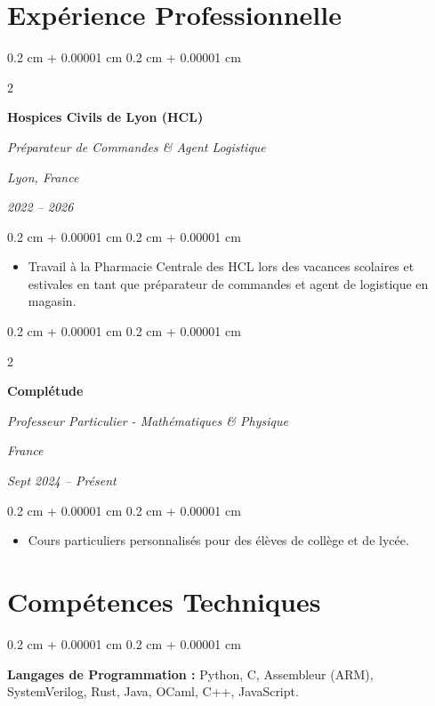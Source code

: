 \documentclass[10pt, a4]{article}
\newenvironment{highlights}{
    \begin{itemize}[
        topsep=0.10 cm,
        parsep=0.10 cm,
        partopsep=0pt,
        itemsep=0pt,
        leftmargin=0.4 cm + 10pt
    ]
}{
    \end{itemize}
} %
\newenvironment{onecolentry}{
    \begin{adjustwidth}{
        0.2 cm + 0.00001 cm
    }{
        0.2 cm + 0.00001 cm
    }
}{
    \end{adjustwidth}
} %
\newenvironment{twocolentry}[2][]{
    \onecolentry
    \def\secondColumn{#2}
    \setcolumnwidth{\fill, 4.5 cm}
    \begin{paracol}{2}
}{
    \switchcolumn \raggedleft \secondColumn
    \end{paracol}
    \endonecolentry
} %
\begin{document}
    \section{Expérience Professionnelle}

        \begin{twocolentry}{
        \textit{Lyon, France}

        \textit{2022 – 2026}}
            \textbf{Hospices Civils de Lyon (HCL)}

            \textit{Préparateur de Commandes \& Agent Logistique}
        \end{twocolentry}

        \vspace{0.10 cm}
        \begin{onecolentry}
            \begin{highlights}
                \item Travail à la Pharmacie Centrale des HCL lors des vacances
                    scolaires et estivales en tant que préparateur de commandes
                    et agent de logistique en magasin.
            \end{highlights}
        \end{onecolentry}

        \begin{twocolentry}{
        \textit{France}

        \textit{Sept 2024 – Présent}}
            \textbf{Complétude}

            \textit{Professeur Particulier - Mathématiques \& Physique}
        \end{twocolentry}

        \vspace{0.10 cm}
        \begin{onecolentry}
            \begin{highlights}
                \item Cours particuliers personnalisés pour des élèves de
                    collège et de lycée.
            \end{highlights}
        \end{onecolentry}


    \section{Compétences Techniques}

        \begin{onecolentry}
            \textbf{Langages de Programmation :} Python, C, Assembleur (ARM),
            SystemVerilog, Rust, Java, OCaml, C++, JavaScript.
        \end{onecolentry}
\end{document}
